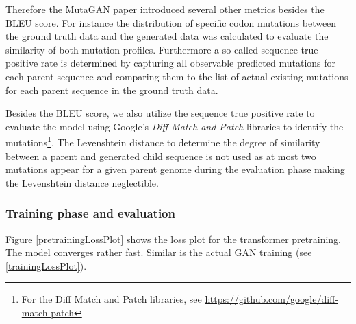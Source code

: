 Therefore the MutaGAN paper \cite{Berman2020} introduced several other metrics besides the \ac{BLEU} score. For instance the distribution of specific codon mutations between the ground truth data and the generated data was calculated to evaluate the similarity of both mutation profiles. Furthermore a so-called sequence true positive rate is determined by capturing all observable predicted mutations for each parent sequence and comparing them to the list of actual existing mutations for each parent sequence in the ground truth data. 

Besides the \ac{BLEU} score, we also utilize the sequence true positive rate to evaluate the model using Google's \textit{Diff Match and Patch} libraries to identify the mutations\footnote{For the Diff Match and Patch libraries, see \url{https://github.com/google/diff-match-patch}}. The Levenshtein distance to determine the degree of similarity between a parent and generated child sequence is not used as at most two mutations appear for a given parent genome during the evaluation phase making the Levenshtein distance neglectible. 

\subsubsection{Training phase and evaluation}  \label{ch:experimentsBa}

Figure \ref{pretrainingLossPlot} shows the loss plot for the transformer pretraining. The model converges rather fast. Similar is the actual \ac{GAN} training (see \ref{trainingLossPlot}). 

